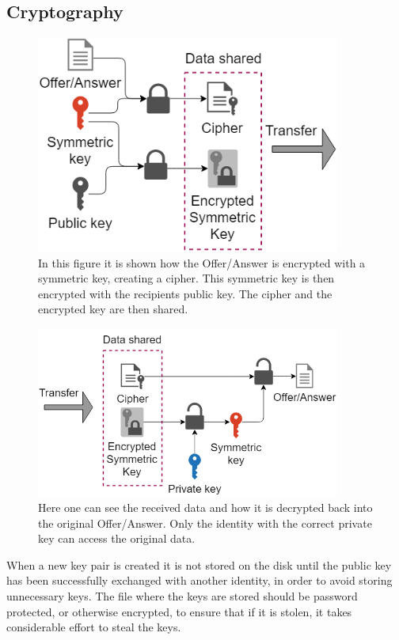 	\subsection{Cryptography}
	\label{sec:crypto_des}
%
	\begin{figure}[th]
	  \centering
	  \includegraphics[width=100mm]{Figures/Encrypt}
	  \decoRule
	  \caption[Authentication exchange: Encryption]{In this figure it is shown how the Offer/Answer is encrypted with a symmetric key, creating a cipher. This symmetric key is then encrypted with the recipients public key. The cipher and the encrypted key are then shared.}
	  \label{fig:enc}
	\end{figure}
	\begin{figure}[th]
	  \centering
	  \includegraphics[width=100mm]{Figures/Decrypt}
	  \decoRule
	  \caption[Authentication exchange: Decryption]{Here one can see the received data and how it is decrypted back into the original Offer/Answer. Only the identity with the correct private key can access the original data.}
	  \label{fig:decr}
	\end{figure}

	When a new key pair is created it is not stored on the disk until the public key has been successfully exchanged with another identity, in order to avoid storing unnecessary keys. The file where the keys are stored should be password protected, or otherwise encrypted, to ensure that if it is stolen, it takes considerable effort to steal the keys.

